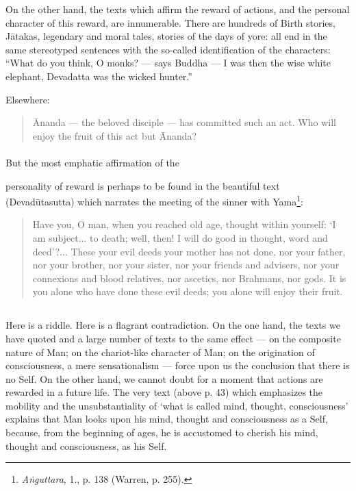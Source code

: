 \documentclass[a4paper, 11pt, oneside, english]{article}
\begin{document}
On the other hand, the texts which affirm the reward of actions, and the personal character of this reward, are innumerable. There are hundreds of Birth stories, Jātakas, legendary and moral tales, stories of the days of yore: all end in the same stereotyped sentences with the so-called identification of the characters: ``What do you think, O monks? --- says Buddha --- I was then the wise white elephant, Devadatta was the wicked hunter.''

Elsewhere:
\begin{quotation}
\small
Ānanda --- the beloved disciple --- has committed such an act. Who will enjoy the fruit of this act but Ānanda?
\end{quotation}
\paragraph{}
But the most emphatic affirmation of the 

personality of reward is perhaps to be found in the beautiful text (Devadūtasutta) which narrates the meeting of the sinner with Yama\footnote{\emph{Aṅguttara}, 1., p. 138 (Warren, p. 255).}:
\begin{quotation}
\small
Have you, O man, when you reached old age, thought within yourself: `I am subject... to death; well, then! I will do good in thought, word and deed'?... These your evil deeds your mother has not done, nor your father, nor your brother, nor your sister, nor your friends and advisers, nor your connexions and blood relatives, nor ascetics, nor Brahmans, nor gods. It is you alone who have done these evil deeds; you alone will enjoy their fruit.
\end{quotation}
\subsection{}
\paragraph{}
Here is a riddle. Here is a flagrant contradiction. On the one hand, the texts we have quoted and a large number of texts to the same effect --- on the composite nature of Man; on the chariot-like character of Man; on the origination of consciousness, a mere sensationalism --- force upon us the conclusion that there is no Self. On the other hand, we cannot doubt for a moment that actions are rewarded in a future life. The very text (above p. 43) which emphasizes the mobility and the unsubstantiality of `what is called mind, thought, consciousness' explains that Man looks upon his mind, thought and consciousness as a Self, because, from the beginning of ages, he is accustomed to cherish his mind, thought and consciousness, as his Self.
\end{document}
